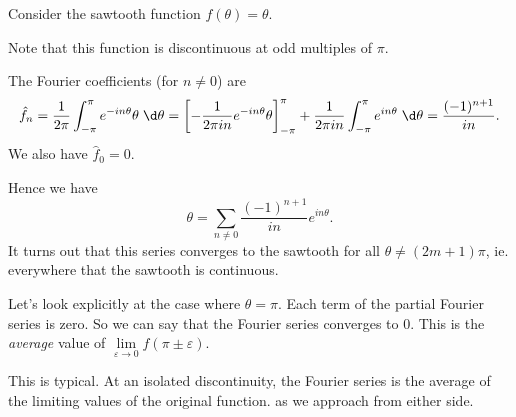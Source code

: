 \documentclass[a4paper]{article}
\begin{document}
\begin{eg}
  Consider the sawtooth function $f(\theta) = \theta$.
  \begin{center}
  \end{center}
  Note that this function is discontinuous at odd multiples of $\pi$.

  The Fourier coefficients (for $n \not= 0$) are
  \[
    \hat{f}_n = \frac{1}{2\pi}\int_{-\pi}^\pi e^{-in\theta}\theta\;\d \theta = \left[-\frac{1}{2\pi i n}e^{-in\theta}\theta\right]_{-\pi}^\pi + \frac{1}{2\pi i n}\int_{-\pi}^\pi e^{in\theta}\;\d \theta = \frac{(-1)^{n + 1}}{in}.
  \]
  We also have $\hat{f}_0 = 0$.

  Hence we have
  \[
    \theta = \sum_{n \not= 0}\frac{(-1)^{n + 1}}{in}e^{in\theta}.
  \]
  It turns out that this series converges to the sawtooth for all $\theta \not= (2m + 1)\pi$, ie. everywhere that the sawtooth is continuous.

  Let's look explicitly at the case where $\theta = \pi$. Each term of the partial Fourier series is zero. So we can say that the Fourier series converges to 0. This is the \emph{average} value of $\lim\limits_{\varepsilon \to 0} f(\pi \pm \varepsilon)$.

  This is typical. At an isolated discontinuity, the Fourier series is the average of the limiting values of the original function. as we approach from either side.
\end{eg}
\end{document}
